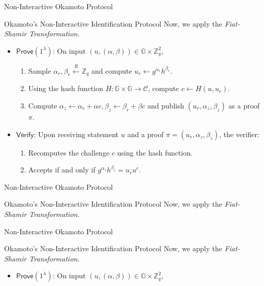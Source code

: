 \documentclass[xcolor={usenames,dvipsnames}]{beamer}
\begin{document}
    \begin{frame}{Non-Interactive Okamoto Protocol}
        \begin{block}{Okamoto's Non-Interactive Identification Protocol}
            Now, we apply the \textit{Fiat-Shamir Transformation}.
            \begin{itemize}
                \item $\mathsf{Prove}(1^{\lambda})$: On input $(u,(\alpha,\beta)) \in \mathbb{G} \times \mathbb{Z}_q^2$, 
                \begin{enumerate}
                    \item Sample $\alpha_r,\beta_r \xleftarrow{R} \mathbb{Z}_q$ and compute $u_r \gets g^{\alpha_r}h^{\beta_r}$.
                    \item Using the hash function $H: \mathbb{G} \times \mathbb{G} \to \mathcal{C}$, compute $c \gets H(u,u_r)$.
                    \item Compute $\alpha_z \gets \alpha_r + \alpha c, \beta_z \gets \beta_r + \beta c$ and publish $(u_r,\alpha_z,\beta_z)$ as a proof $\pi$.
                \end{enumerate}
                \item $\mathsf{Verify}$: Upon receiving statement $u$ and a proof $\pi=(u_r,\alpha_z,\beta_z)$, the verifier:
                \begin{enumerate}
                    \item Recomputes the challenge $c$ using the hash function.
                    \item Accepts if and only if $g^{\alpha_z}h^{\beta_z} = u_ru^c$.
                \end{enumerate}
            \end{itemize}
        \end{block}
    \end{frame}

    \begin{frame}{Non-Interactive Okamoto Protocol}
        \begin{block}{Okamoto's Non-Interactive Identification Protocol}
            Now, we apply the \textit{Fiat-Shamir Transformation}.
        \end{block}
    \end{frame}

    \begin{frame}{Non-Interactive Okamoto Protocol}
        \begin{block}{Okamoto's Non-Interactive Identification Protocol}
            Now, we apply the \textit{Fiat-Shamir Transformation}.
            \begin{itemize}
                \item \textcolor{blue!80!black}{$\mathsf{Prove}(1^{\lambda})$: On input $(u,(\alpha,\beta)) \in \mathbb{G} \times \mathbb{Z}_q^2$, }
            \end{itemize}
        \end{block}
    \end{frame}
\end{document}
